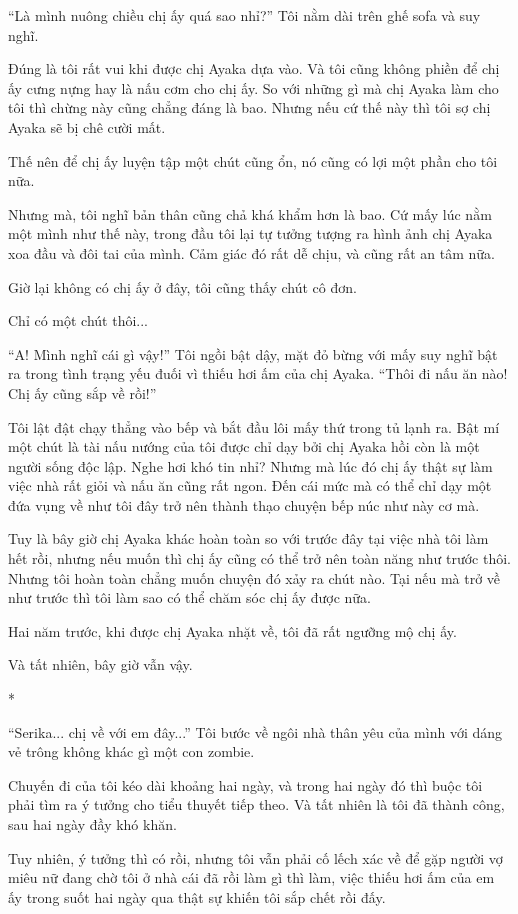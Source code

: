 {``Là mình nuông chiều chị ấy quá sao nhỉ?'' Tôi nằm dài trên ghế sofa và
suy nghĩ.

Đúng là tôi rất vui khi được chị Ayaka dựa vào. Và tôi cũng không phiền
để chị ấy cưng nựng hay là nấu cơm cho chị ấy. So với những gì mà chị
Ayaka làm cho tôi thì chừng này cũng chẳng đáng là bao. Nhưng nếu cứ thế
này thì tôi sợ chị Ayaka sẽ bị chê cười mất.

Thế nên để chị ấy luyện tập một chút cũng ổn, nó cũng có lợi một phần
cho tôi nữa.

Nhưng mà, tôi nghĩ bản thân cũng chả khá khẩm hơn là bao. Cứ mấy lúc nằm
một mình như thế này, trong đầu tôi lại tự tưởng tượng ra hình ảnh chị
Ayaka xoa đầu và đôi tai của mình. Cảm giác đó rất dễ chịu, và cũng rất
an tâm nữa.

Giờ lại không có chị ấy ở đây, tôi cũng thấy chút cô đơn.

Chỉ có một chút thôi...

``A! Mình nghĩ cái gì vậy!'' Tôi ngồi bật dậy, mặt đỏ bừng với mấy suy
nghĩ bật ra trong tình trạng yếu đuối vì thiếu hơi ấm của chị Ayaka.
``Thôi đi nấu ăn nào! Chị ấy cũng sắp về rồi!''

Tôi lật đật chạy thẳng vào bếp và bắt đầu lôi mấy thứ trong tủ lạnh ra.
Bật mí một chút là tài nấu nướng của tôi được chỉ dạy bởi chị Ayaka hồi
còn là một người sống độc lập. Nghe hơi khó tin nhỉ? Nhưng mà lúc đó chị
ấy thật sự làm việc nhà rất giỏi và nấu ăn cũng rất ngon. Đến cái mức mà
có thể chỉ dạy một đứa vụng về như tôi đây trở nên thành thạo chuyện bếp
núc như này cơ mà.

Tuy là bây giờ chị Ayaka khác hoàn toàn so với trước đây tại việc nhà
tôi làm hết rồi, nhưng nếu muốn thì chị ấy cũng có thể trở nên toàn năng
như trước thôi. Nhưng tôi hoàn toàn chẳng muốn chuyện đó xảy ra chút
nào. Tại nếu mà trở về như trước thì tôi làm sao có thể chăm sóc chị ấy
được nữa.

Hai năm trước, khi được chị Ayaka nhặt về, tôi đã rất ngưỡng mộ chị ấy.

Và tất nhiên, bây giờ vẫn vậy.

*

``Serika... chị về với em đây...'' Tôi bước về ngôi nhà thân yêu của
mình với dáng vẻ trông không khác gì một con zombie.

Chuyến đi của tôi kéo dài khoảng hai ngày, và trong hai ngày đó thì buộc
tôi phải tìm ra ý tưởng cho tiểu thuyết tiếp theo. Và tất nhiên là tôi
đã thành công, sau hai ngày đầy khó khăn.

Tuy nhiên, ý tưởng thì có rồi, nhưng tôi vẫn phải cố lếch xác về để gặp
người vợ miêu nữ đang chờ tôi ở nhà cái đã rồi làm gì thì làm, việc
thiếu hơi ấm của em ấy trong suốt hai ngày qua thật sự khiến tôi sắp
chết rồi đấy.

}
